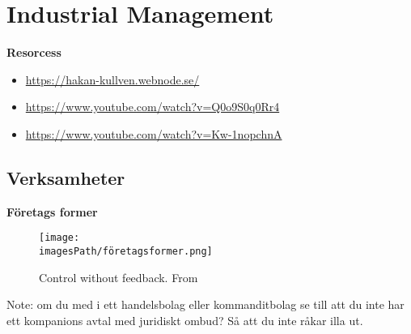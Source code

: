 \chapter{Industrial Management}

\textbf{Resorcess}
\begin{itemize}
    \item \url{https://hakan-kullven.webnode.se/}
    \item \url{https://www.youtube.com/watch?v=Q0o9S0q0Rr4}
    \item \url{https://www.youtube.com/watch?v=Kw-1nopchnA}
\end{itemize}

\newpage

\section{Verksamheter}
\textbf{Företags former}
\begin{figure}[H]
    \centering
    \texttt{[image: \\imagesPath/företagsformer.png]}
    \caption{Control without feedback. From \cite{im}}
\end{figure}


Note: om du med i ett handelsbolag eller kommanditbolag se till att du inte
har ett kompanions avtal med juridiskt ombud? Så att du inte råkar illa ut.


